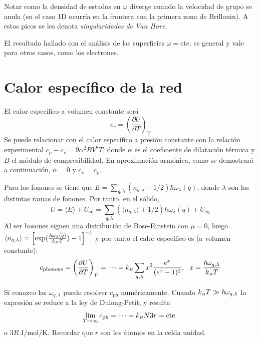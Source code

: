Notar como la densidad de estados en $\omega$ diverge cuando la
velocidad de grupo se anula (en el caso 1D ocurría en la frontera con
la primera zona de Brillouin). A estos picos se les denota
\emph{singularidades de Van Hove}.

El resultado hallado con el análisis de las superficies $\omega =
\text{cte.}$ es general y vale para otros casos, como los electrones.

\section{Calor específico de la red}
\label{sec:cvlattice}
El calor específico a volumen constante será
\begin{equation}
  c_v = \left( \frac{\partial U}{\partial T} \right)_V
\end{equation}
Se puede relacionar con el calor específico a presión constante con la
relación experimental $c_p - c_v = 9 \alpha^2 B V^2 T$, donde $\alpha$
es el coeficiente de dilatación térmica y $B$ el módulo de
compresibilidad. En aproximación armónica, como se demostrará a
continuación, $\alpha = 0$ y $c_v = c_p$.

Para los fonones se tiene que $E = \sum_{q,\lambda}^{ }(n_{q,\lambda} +
1/2) \hbar \omega_\lambda (q)$, donde $\lambda$ son las distintas
ramas de fonones. Por tanto, en el sólido,
\begin{equation}
\label{eq:phU}
  U = \langle E \rangle + U_\text{eq} =  \sum_{q,\lambda}^{
  }(\langle n_{q,\lambda} \rangle + 1/2) \hbar \omega_\lambda (q) + U_\text{eq}
\end{equation}
Al ser bosones siguen una distribución de Bose-Einstein con $\mu = 0$,
luego $\langle n_{q,\lambda} \rangle= \left[\exp(\frac{\hbar \omega_\lambda
  (q)}{k_{\scriptscriptstyle{B}}  T}) - 1\right]^{-1}$ y por tanto el calor específico es (a
volumen constante):
\begin{equation}
\label{eq:phc}
  c_{\text{phonons}} = \left( \frac{\partial U}{\partial T} \right)_V
  = \cdots = k_{\scriptscriptstyle{B}}  \sum_{q,\lambda}^{} x^2 \frac{e^x}{(e^x-1)^2}, \ \ x = \frac{\hbar
    \omega_{q,\lambda}}{k_{\scriptscriptstyle{B}}  T}
\end{equation}

Si conozco las $\omega_{q,\lambda}$ puedo resolver $c_\text{ph}$
numéricamente. Cuando $k_{\scriptscriptstyle{B}} T \gg \hbar \omega_{q,\lambda}$ la expresión
se reduce a la ley de Dulong-Petit, y resulta
\begin{equation}
  \lim_{T\to \infty}c_\text{ph} = \cdots = k_{\scriptscriptstyle{B}}  N3r= \text{cte.}
\end{equation}
o $3R \ \si{\joule\per\mol\per\kelvin}$. Recordar que $r$ son los átomos en la
celda unidad.

